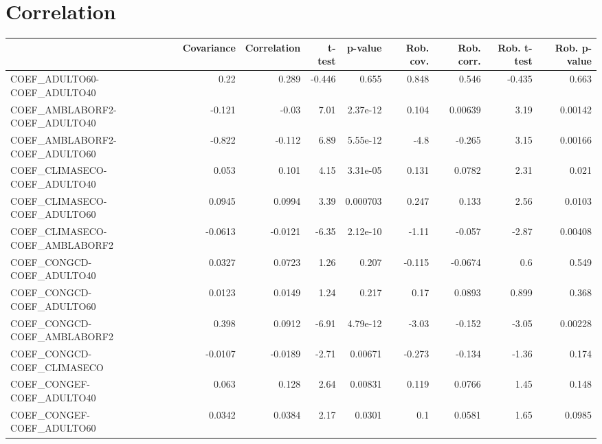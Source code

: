 \section{Correlation}
\begin{tabular}{lrrrrrrrr}
\toprule
{} &  Covariance &  Correlation &  t-test &  p-value &  Rob. cov. &  Rob. corr. &  Rob. t-test &  Rob. p-value \\
\midrule
COEF\_ADULTO60-COEF\_ADULTO40            &        0.22 &        0.289 &  -0.446 &    0.655 &      0.848 &       0.546 &       -0.435 &         0.663 \\
COEF\_AMBLABORF2-COEF\_ADULTO40          &      -0.121 &        -0.03 &    7.01 & 2.37e-12 &      0.104 &     0.00639 &         3.19 &       0.00142 \\
COEF\_AMBLABORF2-COEF\_ADULTO60          &      -0.822 &       -0.112 &    6.89 & 5.55e-12 &       -4.8 &      -0.265 &         3.15 &       0.00166 \\
COEF\_CLIMASECO-COEF\_ADULTO40           &       0.053 &        0.101 &    4.15 & 3.31e-05 &      0.131 &      0.0782 &         2.31 &         0.021 \\
COEF\_CLIMASECO-COEF\_ADULTO60           &      0.0945 &       0.0994 &    3.39 & 0.000703 &      0.247 &       0.133 &         2.56 &        0.0103 \\
COEF\_CLIMASECO-COEF\_AMBLABORF2         &     -0.0613 &      -0.0121 &   -6.35 & 2.12e-10 &      -1.11 &      -0.057 &        -2.87 &       0.00408 \\
COEF\_CONGCD-COEF\_ADULTO40              &      0.0327 &       0.0723 &    1.26 &    0.207 &     -0.115 &     -0.0674 &          0.6 &         0.549 \\
COEF\_CONGCD-COEF\_ADULTO60              &      0.0123 &       0.0149 &    1.24 &    0.217 &       0.17 &      0.0893 &        0.899 &         0.368 \\
COEF\_CONGCD-COEF\_AMBLABORF2            &       0.398 &       0.0912 &   -6.91 & 4.79e-12 &      -3.03 &      -0.152 &        -3.05 &       0.00228 \\
COEF\_CONGCD-COEF\_CLIMASECO             &     -0.0107 &      -0.0189 &   -2.71 &  0.00671 &     -0.273 &      -0.134 &        -1.36 &         0.174 \\
COEF\_CONGEF-COEF\_ADULTO40              &       0.063 &        0.128 &    2.64 &  0.00831 &      0.119 &      0.0766 &         1.45 &         0.148 \\
COEF\_CONGEF-COEF\_ADULTO60              &      0.0342 &       0.0384 &    2.17 &   0.0301 &        0.1 &      0.0581 &         1.65 &        0.0985 \\

\end{tabular}
